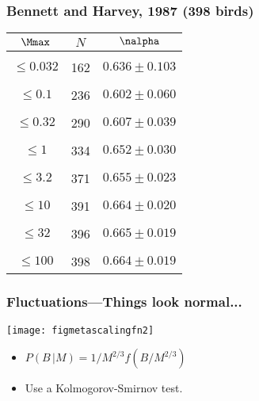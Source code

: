 \begin{frame}
  \frametitle{Bennett and Harvey, 1987 (398 birds)}

  \begin{block}{}
  \begin{center}
    \settablerowcolours
    \begin{tabular}{c|c|c}
      $\Mmax$   & $N$ & $\nalpha$  \\ \hline
      & & \\
      $\leq 0.032$   & 162 & $0.636 \pm 0.103$ \\
      & & \\
      $\leq  0.1$    & 236 & $0.602 \pm 0.060$ \\
      & & \\
      $\leq 0.32$    & 290 & $0.607 \pm 0.039$ \\
      & & \\
      $\leq    1$    & 334 & $0.652 \pm 0.030$ \\
      & & \\
      $\leq  3.2$    & 371 & $0.655 \pm 0.023$ \\
      & & \\
      $\leq   10$    & 391 & $0.664 \pm 0.020$ \\
      & & \\
      $\leq   32$    & 396 & $0.665 \pm 0.019$ \\
      & & \\
      $\leq  100$    & 398 & $0.664 \pm 0.019$ \\
    \end{tabular}
  \end{center}
  \end{block}

\end{frame}

\begin{frame}
  \frametitle{Fluctuations---Things look normal...}

  \begin{block}{}
  \begin{center}
    \texttt{[image: figmetascalingfn2]}

    \begin{itemize}
    \item 
     $  P(B\, |M) = 1/M^{2/3} f(B/M^{2/3})$\\
    \item 
      Use a Kolmogorov-Smirnov test.
    \end{itemize}
  \end{center}
  \end{block}

\end{frame}

